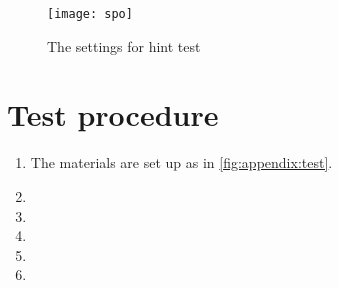 \begin{figure}[H]
	\centering
		\texttt{[image: spo]}
		\caption{The settings for  \gls{hint} test}
		\label{fig:apend_match_bone_air}
\end{figure}

\section*{Test procedure}


\begin{enumerate}
\item The materials are set up as in \autoref{fig:appendix:test}.
\item 
\item  
\item  
\item 
\item 
\end{enumerate}
